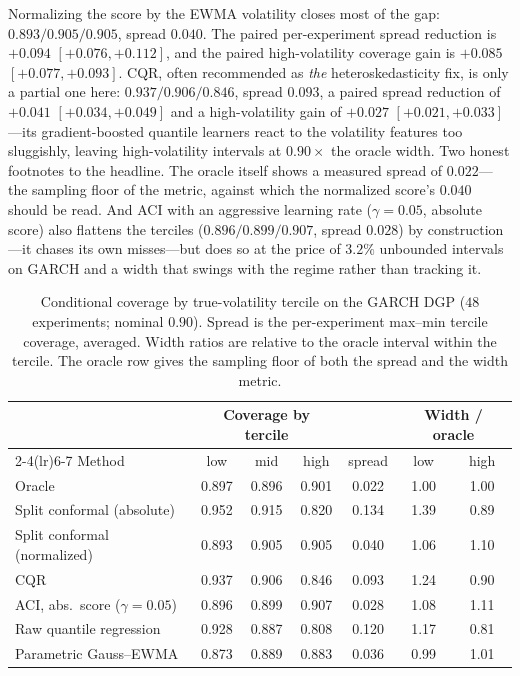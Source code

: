 \documentclass[11pt]{article}
\begin{document}
Normalizing the score by the EWMA volatility closes most of the gap:
$0.893/0.905/0.905$, spread $0.040$. The paired per-experiment spread
reduction is $+0.094$ $[+0.076,+0.112]$, and the paired high-volatility
coverage gain is $+0.085$ $[+0.077,+0.093]$. CQR, often recommended as
\emph{the} heteroskedasticity fix, is only a partial one here:
$0.937/0.906/0.846$, spread $0.093$, a paired spread reduction of $+0.041$
$[+0.034,+0.049]$ and a high-volatility gain of $+0.027$
$[+0.021,+0.033]$---its gradient-boosted quantile learners react to the
volatility features too sluggishly, leaving high-volatility intervals at
$0.90\times$ the oracle width. Two honest footnotes to the headline. The
oracle itself shows a measured spread of $0.022$---the sampling floor of the
metric, against which the normalized score's $0.040$ should be read. And ACI
with an aggressive learning rate ($\gamma=0.05$, absolute score) also flattens
the terciles ($0.896/0.899/0.907$, spread $0.028$) by construction---it chases
its own misses---but does so at the price of $3.2\%$ unbounded intervals on
GARCH and a width that swings with the regime rather than tracking it.

\begin{table}[t]
\centering
\caption{Conditional coverage by true-volatility tercile on the GARCH DGP
($48$ experiments; nominal $0.90$). Spread is the per-experiment max--min
tercile coverage, averaged. Width ratios are relative to the oracle interval
within the tercile. The oracle row gives the sampling floor of both the
spread and the width metric.}
\label{tab:conditional}
\small
\begin{tabular}{lcccccc}
\toprule
& \multicolumn{3}{c}{Coverage by tercile} & & \multicolumn{2}{c}{Width / oracle}\\
\cmidrule(lr){2-4}\cmidrule(lr){6-7}
Method & low & mid & high & spread & low & high \\
\midrule
Oracle                              & 0.897 & 0.896 & 0.901 & 0.022 & 1.00 & 1.00 \\
Split conformal (absolute)          & 0.952 & 0.915 & 0.820 & 0.134 & 1.39 & 0.89 \\
Split conformal (normalized)        & 0.893 & 0.905 & 0.905 & 0.040 & 1.06 & 1.10 \\
CQR                                 & 0.937 & 0.906 & 0.846 & 0.093 & 1.24 & 0.90 \\
ACI, abs.\ score ($\gamma{=}0.05$)  & 0.896 & 0.899 & 0.907 & 0.028 & 1.08 & 1.11 \\
Raw quantile regression             & 0.928 & 0.887 & 0.808 & 0.120 & 1.17 & 0.81 \\
Parametric Gauss--EWMA              & 0.873 & 0.889 & 0.883 & 0.036 & 0.99 & 1.01 \\
\bottomrule
\end{tabular}
\end{table}
\end{document}

